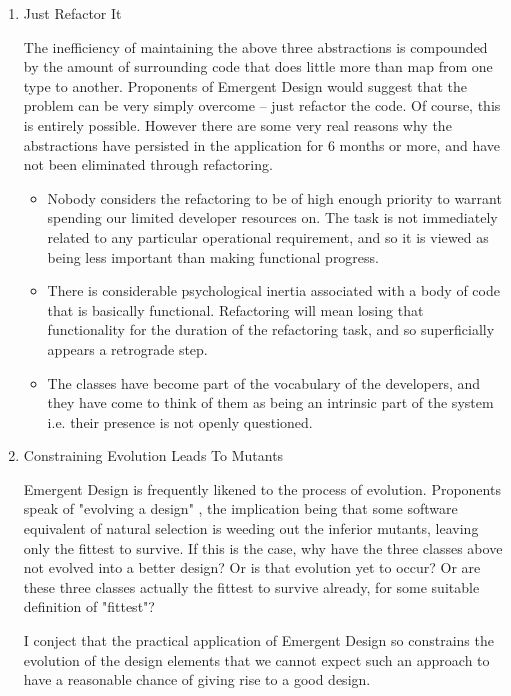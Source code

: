 \documentclass{article}
\begin{document}
\begin{enumerate}
\item Just Refactor It
\label{sec:orgheadline233}

The inefficiency of maintaining the above three abstractions is
compounded by the amount of surrounding code that does little more than
map from one type to another. Proponents of Emergent Design would
suggest that the problem can be very simply overcome -- just refactor
the code. Of course, this is entirely possible. However there are some
very real reasons why the abstractions have persisted in the application
for 6 months or more, and have not been eliminated through refactoring.

\begin{itemize}
\item Nobody considers the refactoring to be of high enough priority to
warrant spending our limited developer resources on. The task is not
immediately related to any particular operational requirement, and so
it is viewed as being less important than making functional
progress.\\
\item There is considerable psychological inertia associated with a body of
code that is basically functional. Refactoring will mean losing that
functionality for the duration of the refactoring task, and so
superficially appears a retrograde step.\\
\item The classes have become part of the vocabulary of the developers, and
they have come to think of them as being an intrinsic part of the
system i.e. their presence is not openly questioned.
\end{itemize}

\item Constraining Evolution Leads To Mutants
\label{sec:orgheadline234}

Emergent Design is frequently likened to the process of evolution.
Proponents speak of "evolving a design" , the implication being that
some software equivalent of natural selection is weeding out the
inferior mutants, leaving only the fittest to survive. If this is the
case, why have the three classes above not evolved into a better design?
Or is that evolution yet to occur? Or are these three classes actually
the fittest to survive already, for some suitable definition of
"fittest"?

I conject that the practical application of Emergent Design so
constrains the evolution of the design elements that we cannot expect
such an approach to have a reasonable chance of giving rise to a good
design.


\end{enumerate}
\end{document}
